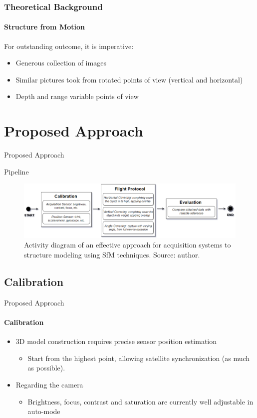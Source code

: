 \documentclass{beamer}
\begin{document}
\begin{frame}
  \frametitle{Theoretical Background}
  \framesubtitle{Structure from Motion}
  \justifying
   For outstanding outcome, it is imperative:
   
   \begin{itemize}
       \item Generous collection of images
       \item Similar pictures took from rotated points of view (vertical and horizontal)
       \item Depth and range variable points of view
   \end{itemize}
  
\end{frame}


\section{Proposed Approach}
\begin{frame}{Proposed Approach}

\begin{block}{Pipeline}
        \begin{figure}
        \includegraphics[scale=.35]{images/dia}
        \caption{Activity diagram of an effective approach for acquisition systems to structure modeling using SfM techniques. Source: author.}
        \end{figure}
    \end{block}    

\end{frame}

\subsection{Calibration}
\begin{frame}{Proposed Approach}
\framesubtitle{Calibration}
\justifying

\begin{itemize}
    \item 3D model construction requires precise sensor position estimation
    \begin{itemize}
        \item  Start from the highest point, allowing satellite synchronization (as much as possible).
    \end{itemize}
        \item Regarding the camera 
    \begin{itemize}
        \item Brightness, focus, contrast and saturation are currently well adjustable in auto-mode
    \end{itemize}
\end{itemize}
    
\end{frame}
\end{document}
